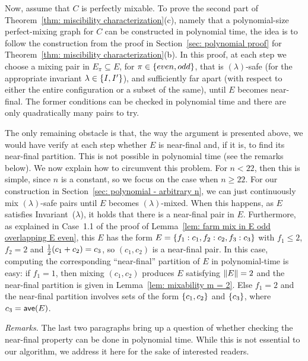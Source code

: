 	Now, assume that $C$ is perfectly mixable.
	To prove the second part of Theorem~\ref{thm: miscibility characterization}(c),
	namely that a polynomial-size perfect-mixing graph for $C$ can be constructed in polynomial time,
	the idea is to follow the construction from the proof in Section~\ref{sec: polynomial proof} 
	for Theorem~\ref{thm: miscibility characterization}(b).
	In this proof, at each step we choose a mixing pair in $E_\pi\subseteq E$, for $\pi\in{ \left\{ even,odd \right\} }$,
	that is $(\lambda)$-safe (for the appropriate invariant $\lambda\in{ \left\{ I,I' \right\} }$), 
	and sufficiently far apart (with respect to either 
	the entire configuration or a subset of the same), until $E$ becomes near-final.
	The former conditions can be checked in polynomial time 
	and there are only quadratically many pairs to try. 
	
	The only remaining obstacle is that, the way the argument is presented above, we would
	have verify at each step whether $E$ is near-final and, if it is, to
	find its near-final partition.  This is not possible in polynomial time (see the remarks below).
	We now explain how to circumvent this problem.
	For $n<22$, then this is simple, since $n$ is a constant, so we focus on the case when $n\ge 22$.
    For our construction in Section~\ref{sec: polynomial - arbitrary n},
	we can just continuously mix $(\lambda)$-safe pairs until $E$ becomes $(\lambda)$-mixed.
	When this happens, as $E$ satisfies Invariant~($\lambda$),
	it holds that there is a near-final pair in $E$.
	Furthermore, as explained in Case~1.1 of the proof of Lemma~\ref{lem: farm mix in E odd overlapping E even},
	this $E$ has the form $E={ \left\{ f_1:c_1,f_2:c_2,f_3:c_3 \right\} }$ 
	with $f_1\leq 2$, $f_2=2$ and ${\textstyle\frac{1}{2}}(c_1+c_2)=c_3$,
	so $(c_1,c_2)$ is a near-final pair.
	In this case, computing the corresponding ``near-final''
	partition of $E$ in polynomial-time is easy:
	if $f_1=1$, then mixing $(c_1,c_2)$ produces $E$ satisfying ${\|E\|}=2$
	and the near-final partition is given in Lemma~\ref{lem: mixability m = 2}.
	Else $f_1=2$ and the near-final partition involves sets of the form 
	${ \left\{ c_1,c_2 \right\} }$ and ${ \left\{ c_3 \right\} }$, where $c_3={\textsf{ave}}(E)$.


\emph{Remarks.}
The last two paragraphs bring up a question of whether checking the near-final property can be
done in polynomial time. While this is not essential to our algorithm, we address it here
for the sake of interested readers.

